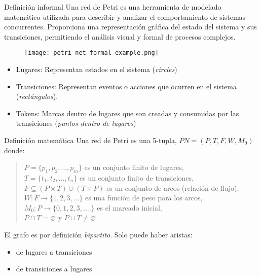 \documentclass{beamer}
\begin{document}
\begin{frame}{Definición informal}
  Una red de Petri es una herramienta de modelado matemático
  utilizada para describir y analizar el comportamiento de sistemas concurrentes.
  Proporciona una representación gráfica del estado del sistema y sus transiciones,
  permitiendo el análisis visual y formal de procesos complejos.

  \begin{figure}[!htb]
    \centering
    \texttt{[image: petri-net-formal-example.png]}
  \end{figure}

  \scriptsize
  \begin{itemize}
    \item Lugares: Representan estados en el sistema (\emph{circles})
    \item Transiciones: Representan eventos o acciones que ocurren en el sistema (\emph{rectángulos}).
    \item Tokens: Marcas dentro de lugares que son creadas
          y consumidas por las transiciones (\emph{puntos dentro de lugares})
  \end{itemize}

  \vfill
\end{frame}

\begin{frame}{Definición matemática}
  Una red de Petri es una 5-tupla, $ PN = (P, T, F, W, M_{0}) $ donde:

  \begin{quote}
    $ P = \{ p_1, p_2, \dots, p_m \} $ es un conjunto finito de lugares,\\
    $ T = \{ t_1, t_2, \dots, t_n \} $ es un conjunto finito de transiciones,\\
    $ F \subseteq (P \times T) \cup (T \times P) $ es un conjunto de arcos (relación de flujo),\\
    $ W: F \rightarrow \{1, 2, 3, ... \} $ es una función de peso para los arcos,\\
    $ M_{0}: P \rightarrow \{0, 1, 2, 3, .... \} $ es el marcado inicial,\\
    $ P \cap T = \varnothing $ y $ P \cup T \neq \varnothing $
  \end{quote}
  
  \vfill

  El grafo es por definición \emph{bipartito}.
  Solo puede haber aristas:
  \begin{itemize}
    \item de lugares a transiciones
    \item de transiciones a lugares
  \end{itemize}

\end{frame}
\end{document}
